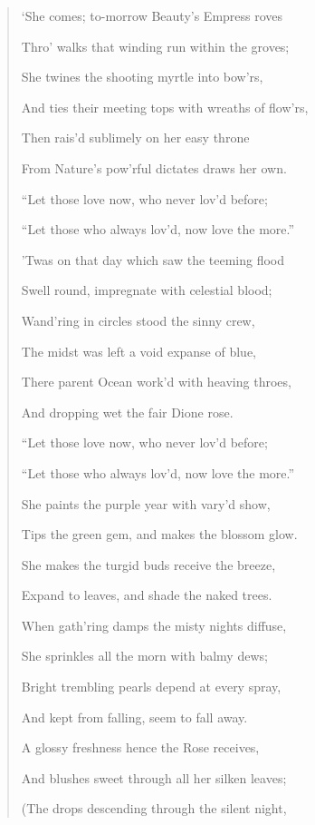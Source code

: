 \documentclass[a4paper, 11pt, oneside, polutonikogreek, english]{article}
\begin{document}
\begin{quotation}\footnotesize
`She comes; to-morrow Beauty's Empress roves

Thro' walks that winding run within the groves;

She twines the shooting myrtle into bow'rs,

And ties their meeting tops with wreaths of flow'rs,

Then rais'd sublimely on her easy throne

From Nature's pow'rful dictates draws her own.

\hspace*{15mm}``Let those love now, who never lov'd before;

``Let those who always lov'd, now love the more.''

\hspace*{15mm}'Twas on that day which saw the teeming flood

Swell round, impregnate with celestial blood;

Wand'ring in circles stood the sinny crew,

The midst was left a void expanse of blue,

There parent Ocean work'd with heaving throes,

And dropping wet the fair Dione rose.

\hspace*{15mm}``Let those love now, who never lov'd before;

``Let those who always lov'd, now love the more.''

\hspace*{15mm}She paints the purple year with vary'd show,

Tips the green gem, and makes the blossom glow.

She makes the turgid buds receive the breeze,

Expand to leaves, and shade the naked trees. 

When gath'ring damps the misty nights diffuse,

She sprinkles all the morn with balmy dews;

Bright trembling pearls depend at every spray,

And kept from falling, seem to fall away.

A glossy freshness hence the Rose receives,

And blushes sweet through all her silken leaves;

(The drops descending through the silent night,


\end{quotation}
\end{document}
